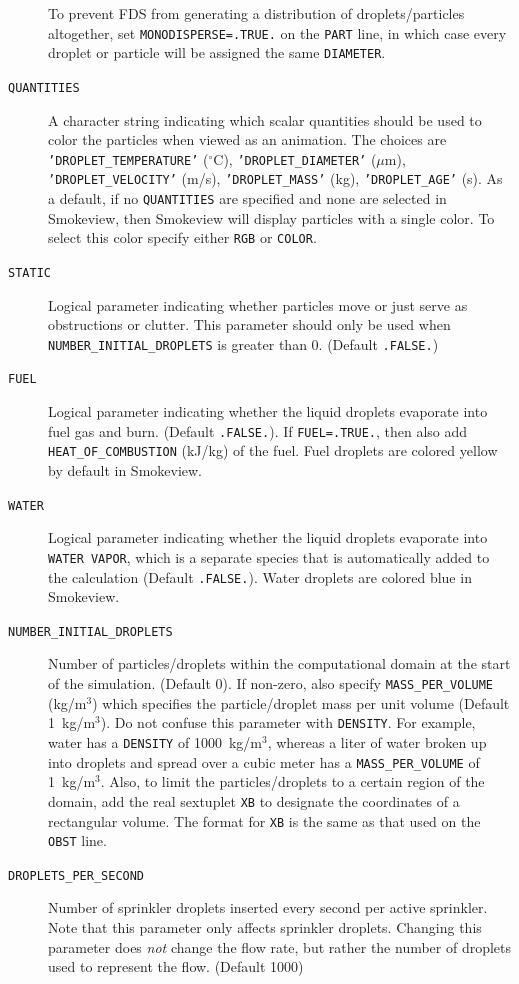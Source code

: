 \documentclass[11pt]{book}
\newcommand{\ct}{\tt\small}
\begin{document}
\begin{description}
To prevent FDS from generating a distribution of droplets/particles altogether, set
{\ct MONODISPERSE=.TRUE.} on the {\ct PART} line, in which case every droplet or particle will be assigned the
same {\ct DIAMETER}.
\item[{\ct QUANTITIES}] A character string indicating which
scalar quantities should be used to color the particles when viewed as an
animation. The choices are {\ct 'DROPLET\_TEMPERATURE'} ($^\circ$C), {\ct 'DROPLET\_DIAMETER'} ($\mu$m),
{\ct 'DROPLET\_VELOCITY'} (m/s), {\ct 'DROPLET\_MASS'} (kg), {\ct 'DROPLET\_AGE'} (s).
As a default, if no {\ct QUANTITIES} are specified and none are selected in Smokeview, then
Smokeview will display particles with a single color.  To select this color specify either {\ct RGB} or
{\ct COLOR}.
\item[{\ct STATIC}] Logical parameter indicating whether particles move or just serve
as obstructions or clutter. This parameter should only be used when
{\ct NUMBER\_INITIAL\_DROPLETS} is greater than 0. (Default {\ct .FALSE.})
\item[{\ct FUEL}] Logical parameter indicating whether the liquid droplets evaporate
into fuel gas and burn. (Default {\ct .FALSE.}). If {\ct FUEL=.TRUE.},
then also add {\ct HEAT\_OF\_COMBUSTION} (kJ/kg) of the fuel. Fuel droplets are colored yellow by default in Smokeview.
\item[{\ct WATER}] Logical parameter indicating whether the liquid droplets evaporate
into {\ct WATER VAPOR}, which is a separate species that is automatically added to the calculation (Default {\ct .FALSE.}).
Water droplets are colored blue in Smokeview.
\item[{\ct NUMBER\_INITIAL\_DROPLETS}]
Number of particles/droplets within the computational domain at the start of the simulation.
(Default 0). If non-zero, also specify {\ct MASS\_PER\_VOLUME} (kg/m$^3$) which
specifies the particle/droplet mass per unit volume (Default 1~kg/m$^3$). Do
not confuse this parameter with {\ct DENSITY}. For example, water has a
{\ct DENSITY} of 1000~kg/m$^3$, whereas a liter of water broken up into droplets
and spread over a cubic meter has a {\ct MASS\_PER\_VOLUME} of 1~kg/m$^3$. Also, to limit the particles/droplets to a
certain region of the domain, add the real sextuplet {\ct XB} to designate the coordinates of a rectangular volume. The format
for {\ct XB} is the same as that used on the {\ct OBST} line.
\item[{\ct DROPLETS\_PER\_SECOND}]  Number of sprinkler droplets inserted every
second per active sprinkler. Note that this parameter only affects sprinkler
droplets. Changing this parameter does {\em not} change the flow rate, but rather the number
of droplets used to represent the flow. (Default 1000)
\end{description}
\end{document}
